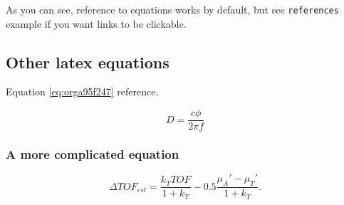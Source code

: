 As you can see, reference to equations works by default, but see \texttt{references}
example if you want links to be clickable.

\subsection{Other latex equations}
\label{sec:orgca08ccf}
Equation \ref{eq:orga95f247} reference.

\begin{equation}
\label{eq:orga95f247}
D = \frac{c\phi}{2\pi f}
\end{equation}

\subsubsection{A more complicated equation}
\label{sec:orgfac2cad}

\begin{equation}
\Delta TOF_{est} = \frac{k_T TOF}{1+k_T } - 0.5 \frac{\mu_A' - \mu_T'}{1+k_T}.
\end{equation}


